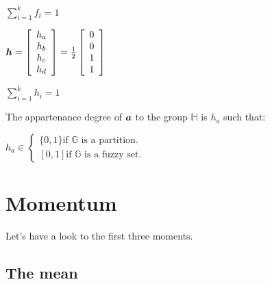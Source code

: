 \documentclass{article}
\newcommand{\bm}[1]{\mbox{\boldmath$#1$}}
\newcommand{\fm}[1]{\mathbb{#1}}
\begin{document}
$\sum_{i=1}^{k} f_i = 1$

$
\bm{h} = 
\left[\begin{array}{c}
 h_a \\
 h_b \\
 h_c \\
 h_d
\end{array}\right]
=
\frac{1}{2}
\left[\begin{array}{c}
 0 \\
 0 \\
 1 \\
 1
\end{array}\right]
$

$\sum_{i=1}^{k} h_i = 1$

The appartenance degree of $\bm{a}$ to the group $\fm{H}$ is $h_a$ such that:

$ h_a \in 
\begin{cases}
 \{0,1\} \text{if $\fm{G}$ is a partition.} \\
 [0,1]   \text{if $\fm{G}$ is a fuzzy set.}
\end{cases}
$

\section{Momentum}

Let's have a look to the first three moments.

\subsection{The mean}
\end{document}

